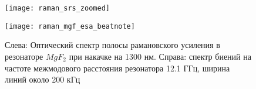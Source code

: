 \begin{figure}[ht]
\begin{minipage}[ht]{0.49\linewidth}\centering
    \texttt{[image: raman\_srs\_zoomed]}
  \end{minipage}
  \hfill
  \begin{minipage}[ht]{0.49\linewidth}\centering
    \texttt{[image: raman\_mgf\_esa\_beatnote]}
  \end{minipage}
    \caption{Слева: Оптический спектр полосы рамановского усиления в резонаторе $MgF_2$ при накачке на 1300 нм. Справа: спектр биений на частоте межмодового расстояния резонатора 12.1 ГГц, ширина линий около 200 кГц}
  \label{mgf_srs_beatnote}
\end{figure}


